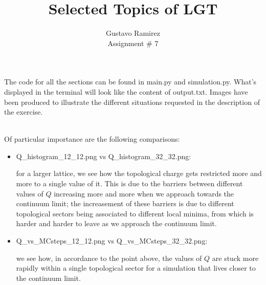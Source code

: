 \documentclass[11pt]{article}
\title{\textbf{Selected Topics of LGT}}
\author{Gustavo Ramirez\\
		Assignment \# 7}
\date{}
\begin{document}
\maketitle

The code for all the sections can be found in main.py and simulation.py. What's displayed in the terminal will look like the content of output.txt. Images have been produced to illustrate the different situations requested in the description of the exercise.

\ \\

Of particular importance are the following comparisons:

\begin{itemize}
\item Q\_histogram\_12\_12.png vs Q\_histogram\_32\_32.png:

for a larger lattice, we see how the topological charge gets restricted more and more to a single value of it. This is due to the barriers between different values of $Q$ increasing more and more when we approach towards the continuum limit; the increasement of these barriers is due to different topological sectors being associated to different local minima, from which is harder and harder to leave as we approach the continuum limit.

\item Q\_vs\_MCsteps\_12\_12.png vs Q\_vs\_MCsteps\_32\_32.png:

we see how, in accordance to the point above, the values of $Q$ are stuck more rapidly within a single topological sector for a simulation that lives closer to the continuum limit.


\end{itemize}
\end{document}
